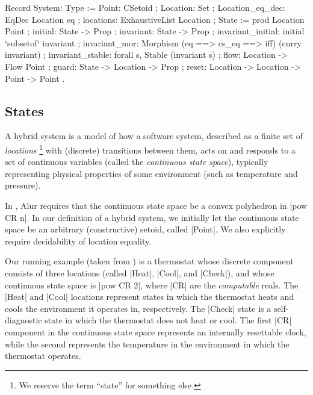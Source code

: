 \documentclass[runningheads]{llncs}
\begin{document}
\begin{code}
Record System: Type :=
  { Point: CSetoid
  ; Location: Set
  ; Location_eq_dec: EqDec Location eq
  ; locations: ExhaustiveList Location
  ; State := prod Location Point
  ; initial: State -> Prop
  ; invariant: State -> Prop
  ; invariant_initial: initial `subsetof` invariant
  ; invariant_mor: Morphism (eq ==> cs_eq ==> iff) (curry invariant)
  ; invariant_stable: forall s, Stable (invariant s)
  ; flow: Location -> Flow Point
  ; guard: State -> Location -> Prop
  ; reset: Location -> Location -> Point -> Point
  }.
\end{code}


\subsection{States}

A hybrid system is a model of how a software system, described as a finite set of \emph{locations} \footnote{We reserve the term ``state'' for something else.} with (discrete) transitions between them, acts on and responds to a set of continuous variables (called the \emph{continuous state space}), typically representing physical properties of some environment (such as temperature and pressure).

In \cite{alur}, Alur requires that the continuous state space be a convex polyhedron in |pow CR n|. In our definition of a hybrid system, we initially let the continuous state space be an arbitrary (constructive) setoid, called |Point|. We also explicitly require decidability of location equality.

Our running example (taken from \cite{alur}) is a thermostat whose discrete component consists of three locations (called |Heat|, |Cool|, and |Check|), and whose continuous state space is |pow CR 2|, where |CR| are the \emph{computable} reals. The |Heat| and |Cool| locations represent states in which the thermostat heats and cools the environment it operates in, respectively. The |Check| state is a self-diagnostic state in which the thermostat does not heat or cool.   The first |CR| component in the continuous state space represents an internally resettable clock, while the second represents the temperature in the environment in which the thermostat operates.
\end{document}
